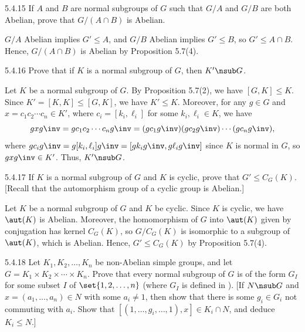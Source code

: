 \begin{exercise}{5.4.15}
    If $A$ and $B$ are normal subgroups of $G$ such that $G/A$ and $G/B$ are both Abelian, prove that $G/(A \cap B)$ is Abelian.
\end{exercise}

\begin{sol}
    $G/A$ Abelian implies $G' \leq A$, and $G/B$ Abelian implies $G' \leq B$, so $G' \leq A \cap B$.
	Hence, $G/(A \cap B)$ is Abelian by Proposition 5.7(4).
\end{sol}

\begin{exercise}{5.4.16}
    Prove that if $K$ is a normal subgroup of $G$, then $K' \nsub G$.
\end{exercise}

\begin{sol}
    Let $K$ be a normal subgroup of $G$.
	By Proposition 5.7(2), we have $[G, K] \leq K$.
	Since $K' = [K, K] \leq [G, K]$, we have $K' \leq K$.
	Moreover, for any $g \in G$ and $x = c_1 c_2 \cdots c_n \in K'$, where $c_i = [k_i, \ell_i]$ for some $k_i, \ell_i \in K$, we have
    \[
    	g x g\inv = g c_1 c_2 \cdots c_n g\inv = (g c_1 g\inv)(g c_2 g\inv) \cdots (g c_n g\inv),
    \]
    where $g c_i g\inv = g [k_i, \ell_i] g\inv = [g k_i g\inv, g \ell_i g\inv]$ since $K$ is normal in $G$, so $g x g\inv \in K'$.
	Thus, $K' \nsub G$.
\end{sol}

\begin{exercise}{5.4.17}
    If $K$ is a normal subgroup of $G$ and $K$ is cyclic, prove that $G' \leq C_G(K)$. [Recall that the automorphism group of a cyclic group is Abelian.]
\end{exercise}

\begin{sol}
    Let $K$ be a normal subgroup of $G$ and $K$ be cyclic.
	Since $K$ is cyclic, we have $\aut(K)$ is Abelian.
	Moreover, the homomorphism of $G$ into $\aut(K)$ given by conjugation has kernel $C_G(K)$, so $G/C_G(K)$ is isomorphic to a subgroup of $\aut(K)$, which is Abelian.
	Hence, $G' \leq C_G(K)$ by Proposition 5.7(4).
\end{sol}

\begin{exercise}{5.4.18}
    Let $K_1, K_2, \ldots, K_n$ be non-Abelian simple groups, and let $G = K_1 \times K_2 \times \cdots \times K_n$.
	Prove that every normal subgroup of $G$ is of the form $G_I$ for some subset $I$ of $\set{1, 2, \ldots, n}$ (where $G_I$ is defined in ). [If $N \nsub G$ and $x = (a_1, \ldots, a_n) \in N$ with some $a_i \neq 1$, then show that there is some $g_i \in G_i$ not commuting with $a_i$.
	Show that $[(1, \ldots, g_i, \ldots, 1), x] \in K_i \cap N$, and deduce $K_i \leq N$.]
\end{exercise}

